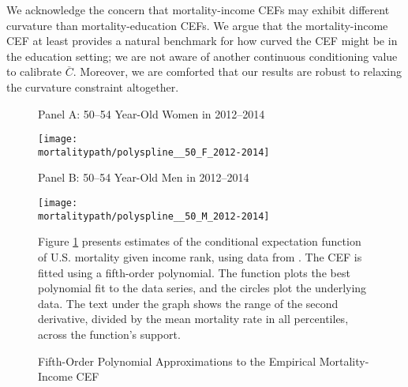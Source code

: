 We acknowledge the concern that mortality-income CEFs may exhibit different curvature than mortality-education CEFs. We argue that the mortality-income CEF at least provides a natural benchmark for how curved the CEF might be in the education setting; we are not aware of another continuous conditioning value to calibrate $\overline{C}$. Moreover, we are comforted that our results are robust to relaxing the curvature constraint altogether.

\begin{figure}[H]
  \caption{Fifth-Order Polynomial Approximations to the Empirical Mortality-Income CEF}
  \label{fig:mort_poly}

\begin{center}
  Panel A: 50--54 Year-Old Women in 2012--2014
\end{center}
  \begin{center}
      \texttt{[image: \\mortalitypath/polyspline\_\_50\_F\_2012-2014]}
  \end{center}

\begin{center}  
  Panel B: 50--54 Year-Old Men in 2012--2014 
\end{center}
  \begin{center}                                                          %
      \texttt{[image: \\mortalitypath/polyspline\_\_50\_M\_2012-2014]} %
  \end{center}                                                            %
  

  \noindent
  \footnotesize{Figure \ref{fig:mort_poly} presents estimates of
    the conditional expectation function of U.S. mortality given
    income rank, using data from \citet{Chetty2016b}. The CEF is
    fitted using a fifth-order polynomial. The function plots the best
    polynomial fit to the data series, and the circles plot the
    underlying data. The text under the graph shows the range of the
    second derivative, divided by the mean mortality rate in all
    percentiles, across the function's support.}
\end{figure}
